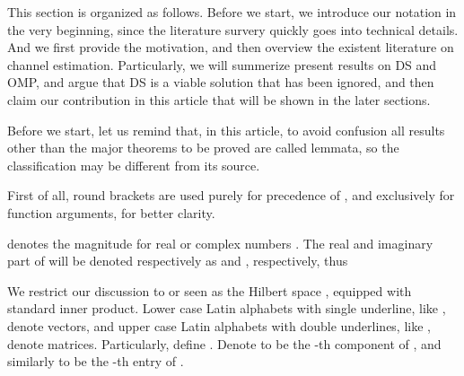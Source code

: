 \startchapter [title={Introduction}]

This section is organized as follows.
Before we start, we introduce our notation in the very beginning, since the literature survery quickly goes into technical details.
And we first provide the motivation, and then overview the existent literature on channel estimation.
Particularly, we will summerize present results on DS and OMP, and argue that DS is a viable solution that has been ignored, and then claim our contribution in this article that will be shown in the later sections.

\startsection [title={Notation}]

Before we start, let us remind that, in this article, to avoid confusion all results other than the major theorems to be proved are called lemmata, so the classification may be different from its source.

First of all, round brackets \m {\RB {\cdot}} are used purely for precedence of , and \m {\SB {\cdot}} exclusively for function arguments, for better clarity.

 denotes the magnitude for real or complex numbers .
The real and imaginary part of  will be denoted respectively as  and , respectively, thus 

We restrict our discussion to  or  seen as the Hilbert space , equipped with standard inner product.
Lower case Latin alphabets with single underline, like , denote vectors, and upper case Latin alphabets with double underlines, like , denote matrices.
Particularly, define .
Denote  to be the -th component of , and similarly  to be the -th entry of .

